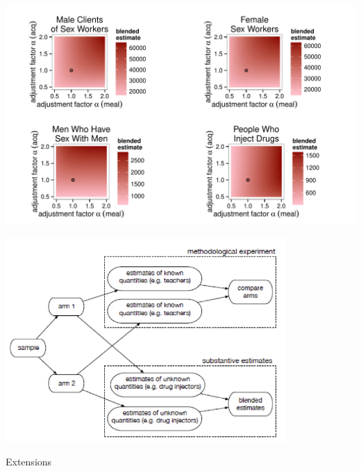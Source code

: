 \documentclass[aspectratio=169]{beamer}
\begin{document}
\begin{frame}

\begin{center}
\includegraphics[width=\textwidth]{figures/feehan_quality_fig6}
\end{center}

\end{frame}
\begin{frame}

\begin{center}
\includegraphics[width=0.8\textwidth]{figures/feehan_quality_2015_fig7}
\end{center}

\end{frame}
\begin{frame}

\LARGE{Extensions}

\end{frame}
\end{document}
